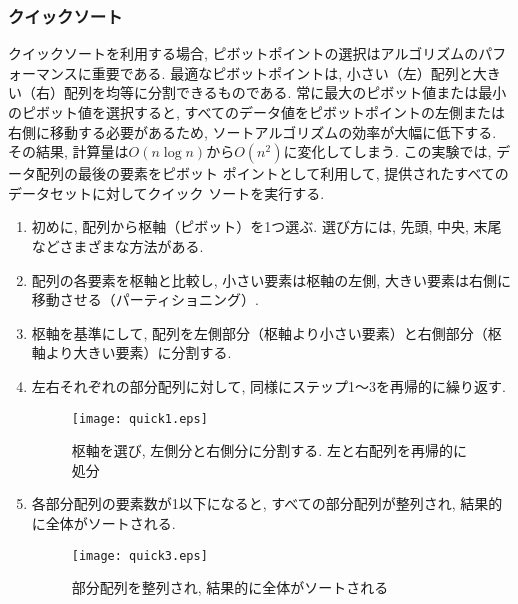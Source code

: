 \documentclass[a4j, 11pt]{jarticle}
\begin{document}
\subsubsection{クイックソート}
クイックソートを利用する場合, ピボットポイントの選択はアルゴリズムのパフォーマンスに重要である. 最適なピボットポイントは, 小さい（左）配列と大きい（右）配列を均等に分割できるものである. 常に最大のピボット値または最小のピボット値を選択すると, すべてのデータ値をピボットポイントの左側または右側に移動する必要があるため, ソートアルゴリズムの効率が大幅に低下する. その結果, 計算量は$O(n \log n)$から$O(n^2)$に変化してしまう\cite{gfg:quicksort2025}. この実験では, データ配列の最後の要素をピボット ポイントとして利用して, 提供されたすべてのデータセットに対してクイック ソートを実行する. \\
\begin{enumerate}
  \item 初めに, 配列から枢軸（ピボット）を1つ選ぶ. 選び方には, 先頭, 中央, 末尾などさまざまな方法がある. 
  \item 配列の各要素を枢軸と比較し, 小さい要素は枢軸の左側, 大きい要素は右側に移動させる（パーティショニング）. 
  \item 枢軸を基準にして, 配列を左側部分（枢軸より小さい要素）と右側部分（枢軸より大きい要素）に分割する. 
  \item 左右それぞれの部分配列に対して, 同様にステップ1～3を再帰的に繰り返す. 
  \begin{figure}[H]
    \centering
    \texttt{[image: quick1.eps]}
    \caption{枢軸を選び, 左側分と右側分に分割する. 左と右配列を再帰的に処分}
  \end{figure}
  \item 各部分配列の要素数が1以下になると, すべての部分配列が整列され, 結果的に全体がソートされる. 
  \begin{figure}[H]
    \centering
    \texttt{[image: quick3.eps]}
    \caption{部分配列を整列され, 結果的に全体がソートされる}
  \end{figure}
\end{enumerate}
\end{document}
